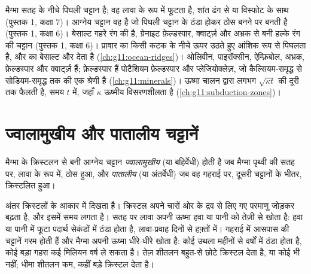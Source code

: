 \begin{recall}
मैग्मा सतह के नीचे पिघली चट्टान है; वह लावा के रूप में फूटता है, शांत ढंग से या
विस्फोट के साथ (पुस्तक 1, कक्षा 7)। आग्नेय चट्टान वह है जो पिघली
चट्टान के ठंडा होकर ठोस बनने पर बनती है (पुस्तक 1, कक्षा 6)। बेसाल्ट गहरे रंग की  है, ग्रेनाइट
फ़ेल्डस्पार, क्वार्ट्ज़ और अभ्रक से बनी हल्के रंग की चट्टान (पुस्तक 1, कक्षा 6)। प्रावार का
 किसी कटक के नीचे ऊपर उठते हुए आंशिक रूप से पिघलता है, और  का बेसाल्ट और
 देता है (\cref{ch:g11:ocean-ridges})।  ओलिवीन, पाइरॉक्सीन, ऐम्फ़िबोल, अभ्रक, फ़ेल्डस्पार और क्वार्ट्ज़ हैं;
फ़ेल्डस्पार हैं पोटैशियम फ़ेल्डस्पार और प्लेजियोक्लेज़, जो कैल्सियम-समृद्ध से
सोडियम-समृद्ध तक की एक श्रेणी है (\cref{ch:g11:minerals})। ऊष्मा चालन द्वारा
लगभग $\sqrt{\kappa t}$ की दूरी तक फैलती है, समय $t$ में, जहाँ
$\kappa$ ऊष्मीय विसरणशीलता है (\cref{ch:g11:subduction-zones})।
\end{recall}

\section{ज्वालामुखीय और पातालीय चट्टानें}

\begin{definition}[ज्वालामुखीय चट्टान; पातालीय चट्टान]\label{def:g11:igneous-rocks:volcanic-plutonic}
मैग्मा के क्रिस्टलन से बनी आग्नेय चट्टान
\emph{ज्वालामुखीय}
(या बहिर्वेधी) होती है जब मैग्मा पृथ्वी की सतह पर, लावा के रूप में, ठोस हुआ,
और \emph{पातालीय} (या अंतर्वेधी) जब वह
गहराई पर, दूसरी चट्टानों के भीतर, क्रिस्टलित हुआ।
\end{definition}

अंतर क्रिस्टलों के आकार में दिखता है। क्रिस्टल अपने चारों ओर के द्रव से लिए गए
परमाणु जोड़कर बढ़ता है, और इसमें समय लगता है। सतह पर
लावा अपनी ऊष्मा हवा या पानी को तेज़ी से खोता है: हवा या पानी में फूटा पदार्थ
सेकंडों में ठंडा होता है, लावा-प्रवाह दिनों से हफ़्तों में। गहराई में
आसपास की चट्टानें गरम होती हैं और मैग्मा अपनी ऊष्मा धीरे-धीरे खोता है: कोई उथला
 महीनों से वर्षों में ठंडा होता है, कोई बड़ा गहरा  कई मिलियन
वर्ष ले सकता है। तेज़ शीतलन बहुत-से छोटे क्रिस्टल देता है, या कोई भी नहीं; धीमा शीतलन
कम, कहीं बड़े क्रिस्टल देता है।

